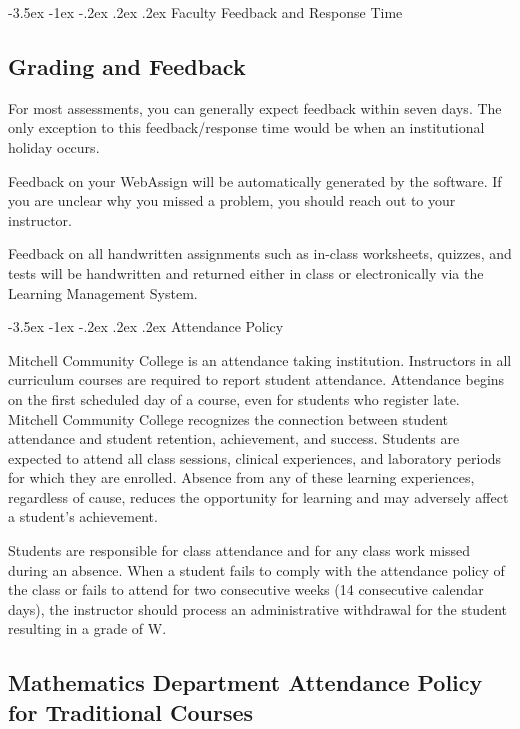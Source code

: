 \documentclass[11pt]{article}
\makeatletter
\renewcommand\section{\@startsection{section}{1}{0pt}%
  {-3.5ex \@plus -1ex \@minus -.2ex}%
  {.2ex \@plus.2ex}%
  {\normalfont\Large\bfseries}} %
\makeatother
\begin{document}
\section{Faculty Feedback and Response Time}

\subsection{Grading and Feedback}

For most assessments, you can generally expect feedback within seven days. The only exception to this feedback/response time would be when an institutional holiday occurs.

Feedback on your WebAssign will be automatically generated by the software. If you are unclear why you missed a problem, you should reach out to your instructor.

Feedback on all handwritten assignments such as in-class worksheets, quizzes, and tests will be handwritten and returned either in class or electronically via the Learning Management System.

\section{Attendance Policy}

Mitchell Community College is an attendance taking institution. Instructors in all curriculum courses are required to report student attendance. Attendance begins on the first scheduled day of a course, even for students who register late. Mitchell Community College recognizes the connection between student attendance and student retention, achievement, and success. Students are expected to attend all class sessions, clinical experiences, and laboratory periods for which they are enrolled. Absence from any of these learning experiences, regardless of cause, reduces the opportunity for learning and may adversely affect a student's achievement.

Students are responsible for class attendance and for any class work missed during an absence. When a student fails to comply with the attendance policy of the class or fails to attend for two consecutive weeks (14 consecutive calendar days), the instructor should process an administrative withdrawal for the student resulting in a grade of W.

\subsection{Mathematics Department Attendance Policy for Traditional Courses}
\end{document}
